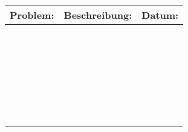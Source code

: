 \documentclass[landscape]{\basedir/fablab-document}
\newcommand{\head}{\bf \LARGE}
\begin{document}
\begin{tabularx}{\textwidth}{|l|X|r|}
	\hline
	\head Problem:	& \head Beschreibung:	& \head Datum:	\\ \hline \hline
					&						&				\\ \hline
					&						&				\\ \hline
					&						&				\\ \hline
					&						&				\\ \hline
					&						&				\\ \hline
					&						&				\\ \hline
					&						&				\\ \hline
					&						&				\\ \hline
					&						&				\\ \hline
					&						&				\\ \hline
					&						&				\\ \hline
					&						&				\\ \hline
					&						&				\\ \hline
					&						&				\\ \hline
					&						&				\\ \hline
					&						&				\\ \hline
					&						&				\\ \hline
					&						&				\\ \hline
					&						&				\\ \hline
					&						&				\\ \hline
					&						&				\\ \hline
					&						&				\\ \hline
					&						&				\\ \hline
					&						&				\\ \hline
					&						&				\\ \hline
					&						&				\\ \hline
					&						&				\\ \hline
					&						&				\\ \hline
\end{tabularx}
\end{document}
